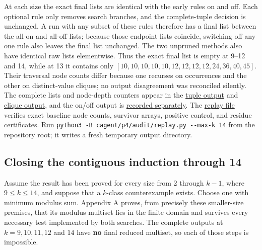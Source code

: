 \documentclass[11pt,a4paper]{article}
\begin{document}
At each size the exact final lists are identical with the early rules on and off. Each optional rule only removes search branches, and the complete-tuple decision is unchanged. A run with any subset of these rules therefore has a final list between the all-on and all-off lists; because those endpoint lists coincide, switching off any one rule also leaves the final list unchanged. The two unpruned methods also have identical raw lists elementwise. Thus the exact final list is empty at 9--12 and 14, while at 13 it contains only \([10,10,10,10,10,12,12,12,12,24,36,40,45]\). Their traversal node counts differ because one recurses on occurrences and the other on distinct-value cliques; no output disagreement was reconciled silently. The complete lists and node-depth counters appear in the \href{https://github.com/mpelteshki/climbing-to-the-frontier/blob/ed55f76eb8c558825bb629fd2cd8dbf46e5f1314/cagent/p4/audit/run-9-14.jsonl}{tuple output} and \href{https://github.com/mpelteshki/climbing-to-the-frontier/blob/ed55f76eb8c558825bb629fd2cd8dbf46e5f1314/cagent/p4/audit/clique-13-14.jsonl}{clique output}, and the on/off output is \href{https://github.com/mpelteshki/climbing-to-the-frontier/blob/ed55f76eb8c558825bb629fd2cd8dbf46e5f1314/cagent/p4/audit/rerun-rule-on-9-14.jsonl}{recorded separately}. The \href{https://github.com/mpelteshki/climbing-to-the-frontier/blob/ed55f76eb8c558825bb629fd2cd8dbf46e5f1314/cagent/p4/audit/replay-evidence-9-14.json}{replay file} verifies exact baseline node counts, survivor arrays, positive control, and residue certificates. Run \texttt{python3\ -B\ cagent/p4/audit/replay.py\ -\/-max-k\ 14} from the repository root; it writes a fresh temporary output directory.

\subsection{Closing the contiguous induction through 14}\label{closing-the-contiguous-induction-through-14}

Assume the result has been proved for every size from 2 through \(k-1\), where \(9\le k\le14\), and suppose that a \(k\)-class counterexample exists. Choose one with minimum modulus sum. Appendix A proves, from precisely these smaller-size premises, that its modulus multiset lies in the finite domain and survives every necessary test implemented by both searches. The complete outputs at \(k=9,10,11,12\) and \(14\) have \textbf{no} final reduced multiset, so each of those steps is impossible.
\end{document}
